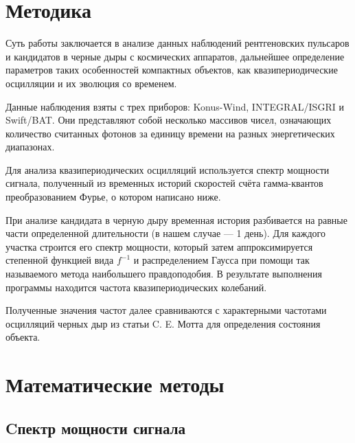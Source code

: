 \section{Методика}

	Суть работы заключается в анализе данных наблюдений рентгеновских пульсаров и кандидатов в черные дыры с космических аппаратов, дальнейшее определение параметров таких особенностей компактных объектов, как квазипериодические осцилляции и их эволюция со временем.

	
	Данные наблюдения взяты с трех приборов: Konus-Wind, INTEGRAL/ISGRI и Swift/BAT. Они представляют собой несколько массивов чисел, означающих количество считанных фотонов за единицу времени на разных энергетических диапазонах.
	
	Для анализа квазипериодических осцилляций используется спектр мощности сигнала, полученный из временных историй скоростей счёта гамма-квантов преобразованием Фурье, о котором написано ниже.
	
	При анализе кандидата в черную дыру временная история разбивается на равные части определенной длительности (в нашем случае --- 1 день). Для каждого участка строится его спектр мощности, который затем аппроксимируется степенной функцией вида $f^{-1}$ и распределением Гаусса при помощи так называемого метода наибольшего правдоподобия. В результате выполнения программы находится частота квазипериодических колебаний.
	
	Полученные значения частот далее сравниваются с характерными частотами осцилляций черных дыр из статьи C. E. Мотта \cite{black_hole} для определения состояния объекта.
	
\section{Математические методы}
	
	\subsection{Cпектр мощности сигнала}
		
